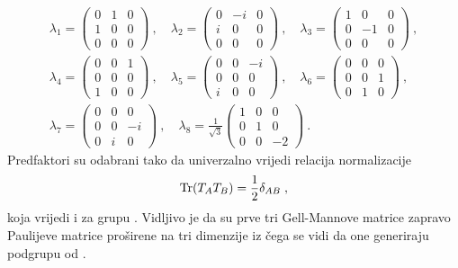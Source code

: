 \begin{gather}
\lambda_1 = \begin{pmatrix} 0 & 1 & 0 \\ 1 & 0 & 0 \\ 0 & 0 & 0 \end{pmatrix}\:,\quad
\lambda_2 = \begin{pmatrix} 0 & -i & 0 \\ i & 0 & 0 \\ 0 & 0 & 0 \end{pmatrix}\:,\quad
\lambda_3 = \begin{pmatrix} 1 & 0 & 0 \\ 0 & -1 & 0 \\ 0 & 0 & 0 \end{pmatrix}\:, \nonumber \\[2ex]
\lambda_4 = \begin{pmatrix} 0 & 0 & 1 \\ 0 & 0 & 0 \\ 1 & 0 & 0 \end{pmatrix}\:,\quad
\lambda_5 = \begin{pmatrix} 0 & 0 & -i \\ 0 & 0 & 0 \\ i & 0 & 0 \end{pmatrix}\:,\quad
\lambda_6 = \begin{pmatrix} 0 & 0 & 0 \\ 0 & 0 & 1 \\ 0 & 1 & 0 \end{pmatrix}\:, \\[2ex]
\lambda_7 = \begin{pmatrix} 0 & 0 & 0 \\ 0 & 0 & -i \\ 0 & i & 0 \end{pmatrix}\:,\quad
\lambda_8 = \frac{1}{\sqrt{3}} \begin{pmatrix} 1 & 0 & 0 \\ 0 & 1 & 0 \\ 0 & 0 & -2 \end{pmatrix}
\:.
\nonumber
\end{gather}
Predfaktori su odabrani tako da univerzalno vrijedi relacija normalizacije
\begin{equation}
 \operatorname{Tr}(T_A T_B) = \frac{1}{2} \delta_{AB} \;,
\label{eq:SU3norm}
\end{equation}
koja vrijedi i za grupu .
Vidljivo je da su prve tri Gell-Mannove matrice zapravo Paulijeve matrice
proširene na tri dimenzije iz čega se vidi da one generiraju  podgrupu od .
